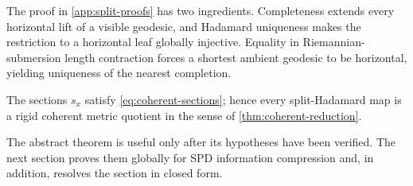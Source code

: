 The proof in \cref{app:split-proofs} has two ingredients.  Completeness
extends every horizontal lift of a visible geodesic, and Hadamard uniqueness
makes the restriction to a horizontal leaf globally injective.  Equality in
Riemannian-submersion length contraction forces a shortest ambient geodesic
to be horizontal, yielding uniqueness of the nearest completion.

\begin{corollary}
\label{cor:split-coherent}
The sections \(s_x\) satisfy \eqref{eq:coherent-sections}; hence every
split-Hadamard map is a rigid coherent metric quotient in the sense of
\cref{thm:coherent-reduction}.
\end{corollary}

The abstract theorem is useful only after its hypotheses have been verified.
The next section proves them globally for SPD information compression and, in
addition, resolves the section in closed form.
